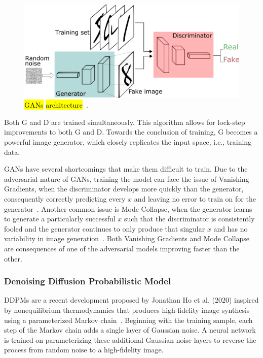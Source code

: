 \documentclass[technologies,article,accept,pdftex,moreauthors]{Definitions/mdpi}
\begin{document}
\begin{figure}[H]
    \includegraphics[width=\columnwidth]{GANs.png}
    \caption{\hl{GANs} %
 \hl{architecture}~\cite{pathmind}.\label{fig:GAN}}
\end{figure}



Both G and D are trained simultaneously. This algorithm allows for lock-step improvements to both G and D. Towards the conclusion of training, G becomes a powerful image generator, which closely replicates the input space, i.e., training data.


GANs have several shortcomings that make them difficult to train. Due to the adversarial nature of GANs, training the model can face the issue of Vanishing Gradients, when the discriminator develops more quickly than the generator, consequently correctly predicting every $x$ and leaving no error to train on for the generator~\cite{google}. Another common issue is Mode Collapse, when the generator learns to generate a particularly successful $x$ such that the discriminator is consistently fooled and the generator continues to only produce that singular $x$ and has no variability in image generation~\cite{google}. Both Vanishing Gradients and Mode Collapse are consequences of one of the adversarial models improving faster than the other.


\subsubsection{Denoising Diffusion Probabilistic Model}

DDPMs are a recent development proposed by Jonathan Ho et al. (2020) inspired by nonequilibrium thermodynamics that produces high-fidelity image synthesis using a parameterized Markov chain~\cite{ho2020denoising}. Beginning with the training sample, each step of the Markov chain adds a single layer of Gaussian noise. A neural network is trained on parameterizing these additional Gaussian noise layers to reverse the process from random noise to a high-fidelity image.
\end{document}
